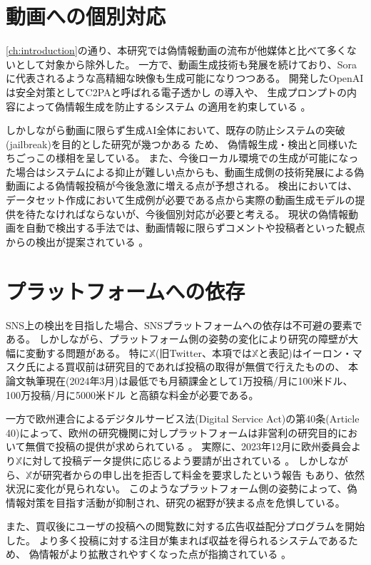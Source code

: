 \section{動画への個別対応}
\cref{ch:introduction}の通り、本研究では偽情報動画の流布が他媒体と比べて多くないとして対象から除外した。
一方で、動画生成技術も発展を続けており、Sora \cite{videoworldsimulators2024}に代表されるような高精細な映像も生成可能になりつつある。
開発したOpenAIは安全対策としてC2PAと呼ばれる電子透かし \cite{C2PA}の導入や、
生成プロンプトの内容によって偽情報生成を防止するシステム \cite{AI_2023}の適用を約束している \cite{AI_2024}。

しかしながら動画に限らず生成AI全体において、既存の防止システムの突破(jailbreak)を目的とした研究が幾つかある \cite{NEURIPS2023_fd661313,shayegani2024jailbreak}ため、
偽情報生成・検出と同様いたちごっこの様相を呈している。
また、今後ローカル環境での生成が可能になった場合はシステムによる抑止が難しい点からも、動画生成側の技術発展による偽動画による偽情報投稿が今後急激に増える点が予想される。
検出においては、データセット作成において生成例が必要である点から実際の動画生成モデルの提供を待たなければならないが、今後個別対応が必要と考える。
現状の偽情報動画を自動で検出する手法では、動画情報に限らずコメントや投稿者といった観点からの検出が提案されている \cite{zong-etal-2024-unveiling}。

\section{プラットフォームへの依存}
SNS上の検出を目指した場合、SNSプラットフォームへの依存は不可避の要素である。
しかしながら、プラットフォーム側の姿勢の変化により研究の障壁が大幅に変動する問題がある。
特に$\mathbb{X}$(旧Twitter、本項では$\mathbb{X}$と表記)はイーロン・マスク氏による買収前は研究目的であれば投稿の取得が無償で行えたものの、
本論文執筆現在(2024年3月)は最低でも月額課金として1万投稿/月に100米ドル、100万投稿/月に5000米ドル \cite{Twitter}と高額な料金が必要である。

一方で欧州連合によるデジタルサービス法(Digital Service Act)の第40条(Article 40)によって、欧州の研究機関に対しプラットフォームは非営利の研究目的において無償で投稿の提供が求められている \cite{DSA}。
実際に、2023年12月に欧州委員会より$\mathbb{X}$に対して投稿データ提供に応じるよう要請が出されている \cite{order23}。
しかしながら、$\mathbb{X}$が研究者からの申し出を拒否して料金を要求したという報告 \cite{xreject}もあり、依然状況に変化が見られない。
このようなプラットフォーム側の姿勢によって、偽情報対策を目指す活動が抑制され、研究の裾野が狭まる点を危惧している。

また、買収後にユーザの投稿への閲覧数に対する広告収益配分プログラムを開始した。
より多く投稿に対する注目が集まれば収益を得られるシステムであるため、
偽情報がより拡散されやすくなった点が指摘されている \cite{Davis_2023}。